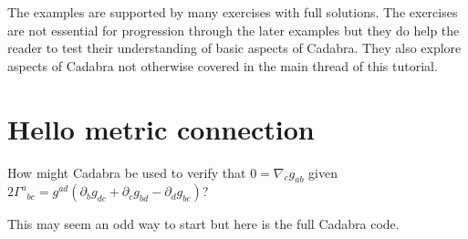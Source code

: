\documentclass[a4paper,12pt]{article}
\numberwithin{equation}{section}%
\begin{document}
The examples are supported by many exercises with full solutions. The exercises are not
essential for progression through the later examples but they do help the reader to test
their understanding of basic aspects of Cadabra. They also explore aspects of Cadabra not
otherwise covered in the main thread of this tutorial.

\clearpage

\section{Hello metric connection}
\label{sec:ex-01}
\ResetCounters



How might Cadabra be used to verify that $0=\nabla_{c}g_{ab}$ given $2\Gamma^{a}{}_{bc} =
g^{ad}\left(\partial_{b}g_{dc} + \partial_{c} g_{bd} - \partial_{d} g_{bc}\right)$?

This may seem an odd way to start but here is the full Cadabra code.
\end{document}
